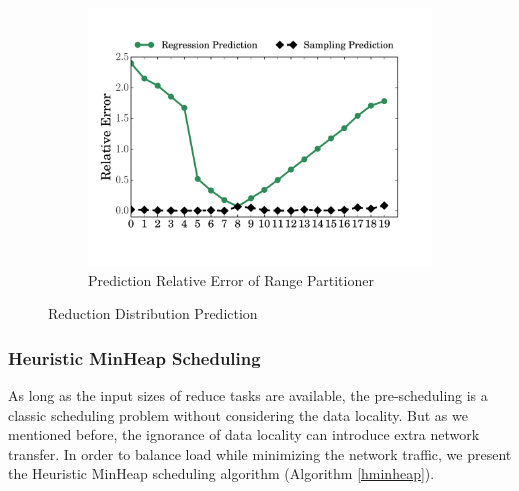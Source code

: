 \begin{figure}
\begin{subfigure}[b]{0.32\linewidth}
		\includegraphics[width=\linewidth]{fig/prediction_relative_error}
		\caption{Prediction Relative Error of Range Partitioner}
		\label{fig:prediction_relative_error}
	\end{subfigure}
	\caption{Reduction Distribution Prediction}
	\label{fig:dis}
	\vspace{-1em}
\end{figure}

\subsubsection{Heuristic MinHeap Scheduling}\label{h-minheap}

\ifrevision
{}
\fi

As long as the input sizes of reduce tasks are available, the pre-scheduling is a classic scheduling problem without considering the data locality. 
But as we mentioned before, the ignorance of data locality can introduce extra network transfer. 
In order to balance load while minimizing the network traffic, we present the Heuristic MinHeap scheduling algorithm (Algorithm \ref{hminheap}).   


